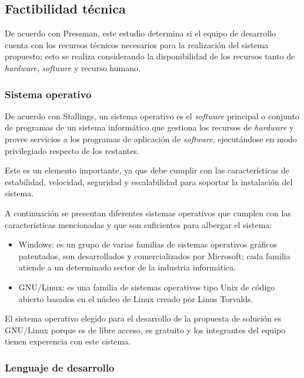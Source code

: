 \subsection{Factibilidad técnica}

De acuerdo con Pressman\cite{pressman_software_2005}, este estudio determina si el equipo de desarrollo cuenta con los recursos técnicos necesarios para la realización del sistema propuesto; esto se realiza considerando la disponibilidad de los recursos tanto de \textit{hardware}, \textit{software} y recurso humano.

\subsubsection*{Sistema operativo}

De acuerdo con Stallings\cite{stallings_operating_2012}, un sistema operativo es el \textit{software} principal o conjunto de programas de un sistema informático que gestiona los recursos de \textit{hardware} y provee servicios a los programas de aplicación de \textit{software}, ejecutándose en modo privilegiado respecto de los restantes.


Este es un elemento importante, ya que debe cumplir con las características de estabilidad, velocidad, seguridad y escalabilidad para soportar la instalación del sistema.


A continuación se presentan diferentes sistemas operativos que cumplen con las características mencionadas y que son suficientes para albergar el sistema:

\begin{itemize}
    \item Windows: es un grupo de varias familias de sistemas operativos gráficos patentados, son desarrollados y comercializados por Microsoft; cada familia atiende a un determinado sector de la industria informática\cite{wilson_about_2015}.
    \item GNU/Linux: es una familia de sistemas operativos tipo Unix de código abierto basados en el núcleo de Linux creado por Linus Torvalds\cite{love_linux_2010}.
\end{itemize}

El sistema operativo elegido para el desarrollo de la propuesta de solución es GNU/Linux porque es de libre acceso, es gratuito y los integrantes del equipo tienen experencia con este sistema.


\subsubsection*{Lenguaje de desarrollo}

